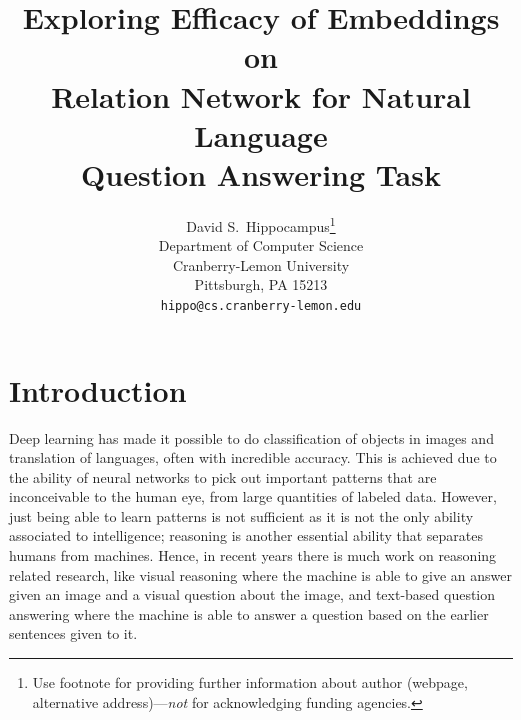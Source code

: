 \documentclass{article}
\title{Exploring Efficacy of Embeddings on \\ Relation Network for Natural Language \\ Question Answering Task}
\author{
  David S.~Hippocampus\thanks{Use footnote for providing further
    information about author (webpage, alternative
    address)---\emph{not} for acknowledging funding agencies.} \\
  Department of Computer Science\\
  Cranberry-Lemon University\\
  Pittsburgh, PA 15213 \\
  \texttt{hippo@cs.cranberry-lemon.edu} \\
}
\begin{document}

\maketitle



\section{Introduction}
%

	Deep learning has made it possible to do classification of objects in images and translation of languages, often with incredible accuracy. This is achieved due to the ability of neural networks to pick out important patterns that are inconceivable to the human eye, from large quantities of labeled data. However, just being able to learn patterns is not sufficient as it is not the only ability associated to intelligence; reasoning is another essential ability \cite{Bottou2011} that separates humans from machines. Hence, in recent years there is much work on reasoning related research, like visual reasoning \cite{Johnson2017, Santoro2017} where the machine is able to give an answer given an image and a visual question about the image, and text-based question answering \cite{Santoro2017} where the machine is able to answer a question based on the earlier sentences given to it. 
\end{document}
